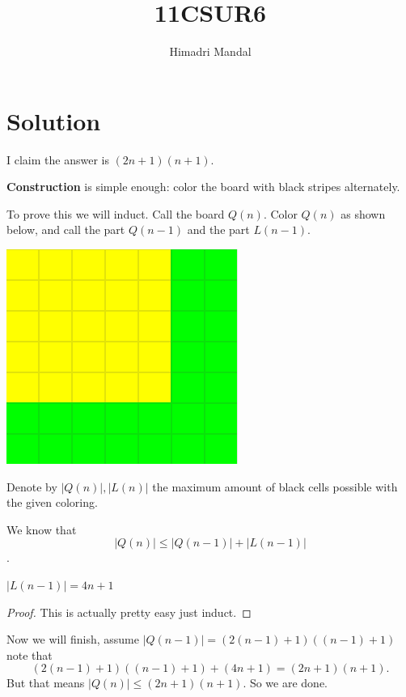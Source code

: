 \documentclass[11pt]{scrartcl}
\title{11CSUR6}
\author{Himadri Mandal}
\begin{document}
\maketitle

\section{Solution}
\begin{soln}
	
\raggedright
I claim the answer is $(2n+1)(n+1)$.

\textbf{Construction} is simple enough: color the board with black stripes alternately.

To prove this we will induct.
Call the board $Q(n)$. Color $Q(n)$ as shown below, and call the \textbf{\color{yellow}} part $Q(n-1)$ and the \textbf{\color{green}} part $L(n-1)$.

\begin{center}
	\includegraphics[scale=0.5]{../11CSUR6/11CSUR6.png}
\end{center}

Denote by $|Q(n)|, |L(n)|$ the maximum amount of black cells possible with the given coloring.

We know that $$|Q(n)| \leq |Q(n-1)| + |L(n-1)|$$.

\begin{claim}
	$|L(n-1)| = 4n+1$
\end{claim}
\begin{proof}
	This is actually pretty easy just induct.
\end{proof}

Now we will finish, assume $|Q(n-1)| = (2(n-1)+1)((n-1)+1)$ 
note that $$(2(n-1)+1)((n-1)+1)+(4n+1) = (2n+1)(n+1).$$ But that means $|Q(n)| \leq (2n+1)(n+1)$. 
So we are done.

\end{soln}
\end{document}
